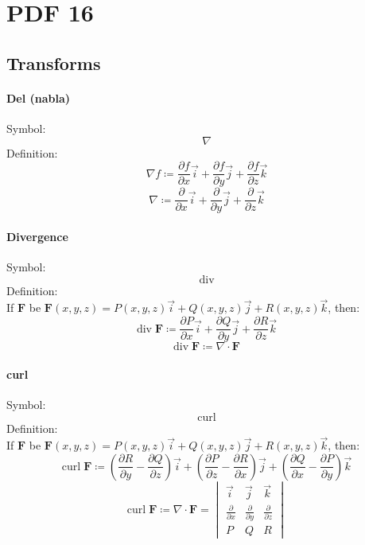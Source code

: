 \documentclass[12pt, fleqn]{book}
\newcommand{\F}{\mathbf{F}}
\newcommand{\Curl}{\mathrm{curl}}
\newcommand{\Div}{\mathrm{div}}
\newcommand{\xyz}{(x, y, z)}
\newcommand{\rond}[2]{\frac{\partial #1}{\partial #2}}
\begin{document}
\chapter{PDF 16}\label{pdf16}
	\section{Transforms}
		\subsubsection{Del (nabla)}
			Symbol:
			\begin{equation}
				\nabla
			\end{equation}
			Definition:
			\begin{equation}
				\nabla f \coloneqq \rond{f}{x}\vec{i} + \rond{f}{y}\vec{j} + \rond{f}{z}\vec{k}
			\end{equation}
		    \begin{equation}
		    	\nabla \coloneqq \rond{}{x}\vec{i} + \rond{}{y}\vec{j} + \rond{}{z}\vec{k}
		    \end{equation}
	    \subsubsection{Divergence}
	    	Symbol:
	    	\begin{equation}
	    		\Div
	    	\end{equation}
    		Definition: \\
    		If $\F$ be $\F\xyz = P\xyz\vec{i} + Q\xyz\vec{j} + R\xyz\vec{k}$, then:
    		\begin{equation}
    			\Div \; \F \coloneqq \rond{P}{x}\vec{i} + \rond{Q}{y}\vec{j} + \rond{R}{z}\vec{k}
    		\end{equation}
    		\begin{equation}
    			\Div \; \F \coloneqq \nabla \cdot \F
    		\end{equation}
    	\subsubsection{curl}
    		Symbol:
    		\begin{equation}
    			\Curl
    		\end{equation}
    		Definition: \\
    		If $\F$ be $\F\xyz = P\xyz\vec{i} + Q\xyz\vec{j} + R\xyz\vec{k}$, then:
    		\begin{equation}
    			\Curl \; \F \coloneqq (\rond{R}{y} - \rond{Q}{z})\vec{i} + (\rond{P}{z} - \rond{R}{x})\vec{j} + (\rond{Q}{x} - \rond{P}{y})\vec{k} 
     		\end{equation}
     		\begin{equation}
     			\Curl \; \F \coloneqq \nabla \cdot \F = 
     			\begin{vmatrix}
     				\vec{i} & \vec{j} & \vec{k} \\
     				\rond{}{x} &  \rond{}{y} & \rond{}{z} \\
     				P & Q & R
     			\end{vmatrix}
     		\end{equation}
\end{document}
